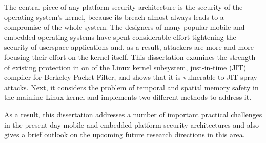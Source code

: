 The central piece of any platform security architecture is the security of the operating system's kernel, because its breach almost always leads to a compromise of the whole system. The designers of many popular mobile and embedded operating systems have spent considerable effort tightening the security of userspace applications and, as a result, attackers are more and more focusing their effort on the kernel itself. This dissertation examines the strength of existing protection in on of the Linux kernel subsystem, just-in-time (JIT) compiler for Berkeley Packet Filter, and shows that it is vulnerable to JIT spray attacks. Next, it considers the problem of temporal and spatial memory safety in the mainline Linux kernel and implements two different methods to address it.   

As a result, this dissertation addresses a number of important practical challenges in the present-day mobile and embedded platform security architectures and also gives a brief outlook on the upcoming future research directions in this area.  


